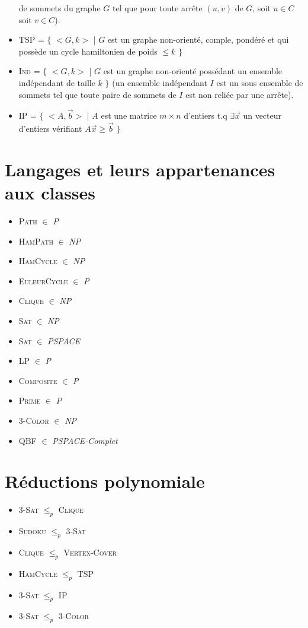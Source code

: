 \documentclass[a4paper,11pt]{report}
\newcommand{\Poly}{\textit{P}}
\newcommand{\NPoly}{\textit{NP}}
\newcommand{\PSpace}{\textit{PSPACE}}
\newcommand{\PSpaceComp}{\textit{PSPACE-Complet}}
\newcommand{\PolyReduc}[2]{\textsc{#1} $\le_{p}$ \textsc{#2}}
\newcommand{\languageDef}[3]{\textsc{#1} = $\{$ #2 | #3 $\}$}
\begin{document}
\begin{itemize}
de sommets du graphe $G$ tel que pour toute arrête $(u,v)$ de $G$, soit $u\in C$
soit $v \in C$).
\item \languageDef{TSP}{$<G,k>$}{$G$ est un graphe non-orienté, comple, pondéré et qui possède un cycle hamiltonien de poids $\le k$}
\item \languageDef{Ind}{$<G,k>$}{$G$ est un graphe non-orienté possédant un ensemble indépendant de taille $k$} (un ensemble indépendant $I$ est un sous
ensemble de sommets tel que toute paire de sommets de $I$ est non reliée par
une arrête).
\item \languageDef{IP}{$<A,\overset{\rightarrow}{b}>$}{$A$ est une matrice $m \times n$ d'entiers t.q $\exists \overset{\rightarrow}{x}$ un vecteur d'entiers vérifiant $A\overset{\rightarrow}{x} \ge \overset{\rightarrow}{b}$}

\end{itemize}

\section{Langages et leurs appartenances aux classes}
\begin{itemize}
\item \textsc{Path} $\in$ \Poly
\item \textsc{HamPath} $\in$ \NPoly
\item \textsc{HamCycle} $\in$ \NPoly
\item \textsc{EuleurCycle} $\in$ \Poly
\item \textsc{Clique} $\in$ \NPoly
\item \textsc{Sat} $\in$ \NPoly
\item \textsc{Sat} $\in$ \PSpace
\item \textsc{LP} $\in$ \Poly
\item \textsc{Composite} $\in$ \Poly
\item \textsc{Prime} $\in$ \Poly
\item \textsc{3-Color} $\in$ \NPoly
\item \textsc{QBF} $\in$ \PSpaceComp
\end{itemize}

\section{Réductions polynomiale}
\begin{itemize}
\item \PolyReduc{3-Sat}{Clique}
\item \PolyReduc{Sudoku}{3-Sat}
\item \PolyReduc{Clique}{Vertex-Cover}
\item \PolyReduc{HamCycle}{TSP}
\item \PolyReduc{3-Sat}{IP}
\item \PolyReduc{3-Sat}{3-Color}
\end{itemize}
\end{document}
